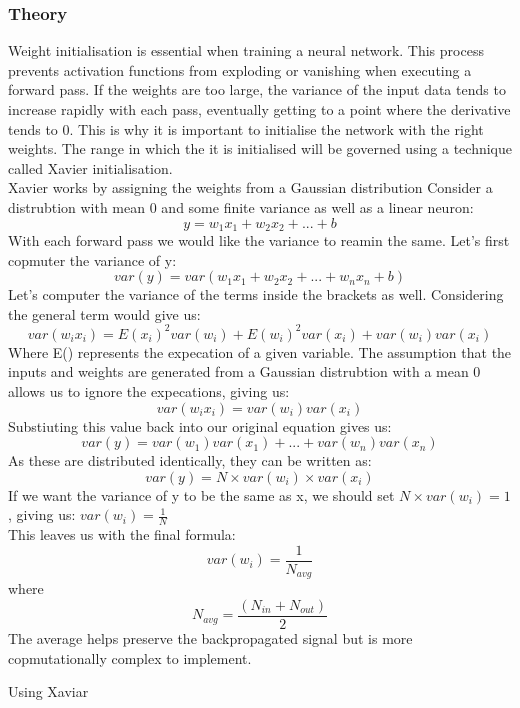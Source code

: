 \documentclass{article}
\begin{document}
\subsubsection{Theory}
Weight initialisation is essential when training a neural network. This process prevents
activation functions from exploding or vanishing when executing a forward pass. If the weights are too large, the variance of the input data tends to increase rapidly with each pass, eventually
getting to a point where the derivative tends to 0. This is why it is important to initialise the network with the right weights. The range in which the it is initialised will be governed using a technique called Xavier initialisation.\\
Xavier works by assigning the weights from a Gaussian distribution
Consider a distrubtion with mean 0 and some finite variance as well as a linear neuron: $$y = w_1x_1 + w_2x_2 + ... + b$$
With each forward pass we would like the variance to reamin the same.
Let's first copmuter the variance of y:
$$var(y) = var(w_1x_1 + w_2x_2 + ...+w_nx_n + b)$$
Let's computer the variance of the terms inside the brackets as well. Considering the general term would give us:
$$var(w_ix_i) = E(x_i)^2var(w_i) + E(w_i)^2var(x_i) + var(w_i)var(x_i)$$
Where E() represents the expecation of a given variable. The assumption that the inputs and weights are generated from a Gaussian distrubtion with a mean 0 allows us to ignore the expecations, giving us:
$$var(w_ix_i) = var(w_i)var(x_i) $$
Substiuting this value back into our original equation gives us:
$$var(y) = var(w_1)var(x_1)+ ... + var(w_n)var(x_n)$$
As these are distributed identically, they can be written as:
$$var(y) = N \times var(w_i) \times var(x_i)$$
If we want the variance of y to be the same as x, we should set $N\times var(w_i) = 1$, giving us:
$var(w_i) = \frac{1}{N}$
\\This leaves us with the final formula:
$$var(w_i) = \frac{1}{N_{avg}}$$
where $$N_{avg} = \frac{(N_{in} + N_{out})}{2}$$
The average helps preserve the backpropagated signal but is more copmutationally complex to implement.



\begin{algorithm}
\caption{Using Xaviar}
\begin{algorithmic}[0]
    \EndFor
\EndWhile
\end{algorithmic}
\end{algorithm}
\end{document}
